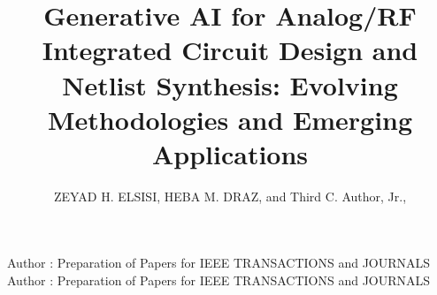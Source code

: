 \documentclass{ieeeaccess}
\begin{document}

\title{Generative AI for Analog/RF Integrated Circuit Design and Netlist Synthesis: Evolving Methodologies and Emerging Applications}
\author{\uppercase{Zeyad H. ElSisi},
\uppercase{Heba M. Draz}, and Third C. Author,
Jr.,
}

\address[1]{National Institute of Standards and
Technology, Boulder, CO 80305 USA (e-mail: author@boulder.nist.gov)}
\address[2]{Department of Physics, Colorado State University, Fort Collins,
CO 80523 USA (e-mail: author@lamar.colostate.edu)}
\address[3]{Electrical Engineering Department, University of Colorado, Boulder, CO
80309 USA}

\markboth
{Author \headeretal: Preparation of Papers for IEEE TRANSACTIONS and JOURNALS}
{Author \headeretal: Preparation of Papers for IEEE TRANSACTIONS and JOURNALS}

\end{document}
